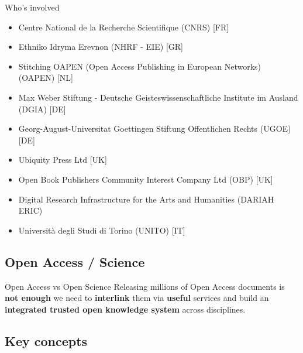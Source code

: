 \documentclass[xcolor=svgnames]{beamer}
\begin{document}
        \begin{frame}{Who's involved}
            \begin{center}
                \begin{itemize}
                    \item Centre National de la Recherche Scientifique (CNRS) [FR]
                    \item Ethniko Idryma Erevnon (NHRF - EIE) [GR]
                    \item Stitching OAPEN (Open Access Publishing in European Networks) (OAPEN) [NL]
                    \item Max Weber Stiftung - Deutsche Geisteswissenschaftliche Institute im Ausland (DGIA) [DE]
                    \item Georg-August-Universitat Goettingen Stiftung Offentlichen Rechts (UGOE) [DE]
                    \item Ubiquity Press Ltd [UK]
                    \item Open Book Publishers Community Interest Company Ltd (OBP) [UK]
                    \item Digital Research Infrastructure for the Arts and Humanities (DARIAH ERIC)
                    \item Università degli Studi di Torino (UNITO) [IT]
                \end{itemize}
            \end{center}
        \end{frame}

    \subsection{Open Access / Science}

        \begin{frame}{Open Access vs Open Science}
            Releasing millions of Open Access documents is \textbf{not enough}
            \pause
            we need to \textbf{interlink} them
            \pause
            via \textbf{useful} services
            \pause
            and build an \textbf{integrated trusted open knowledge system} across disciplines.
        \end{frame}

    \subsection{Key concepts}
\end{document}
